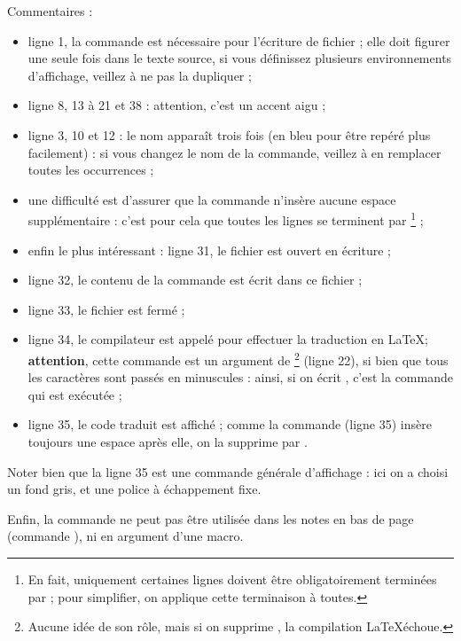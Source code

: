 Commentaires :
\begin{itemize}
  \item ligne 1, la commande  est nécessaire pour l'écriture de fichier ; elle doit figurer une seule fois dans le texte source, si vous définissez plusieurs environnements d'affichage, veillez à ne pas la dupliquer ; 
  \item ligne 8, 13 à 21 et 38 : attention, c'est un accent aigu  ;
  \item ligne 3, 10 et 12 : le nom  apparaît trois fois (en bleu pour être repéré plus facilement) : si vous changez le nom de la commande, veillez à en remplacer toutes les occurrences ;
  \item une difficulté est d'assurer que la commande n'insère aucune espace supplémentaire : c'est pour cela que toutes les lignes se terminent par \tpp{\%}\footnote{En fait, uniquement certaines lignes doivent être obligatoirement terminées par \tpp{\%} ; pour simplifier, on applique cette terminaison à toutes.} ;
    \item enfin le plus intéressant : ligne 31, le fichier  est ouvert en écriture ;
    \item ligne 32, le contenu de la commande est écrit dans ce fichier ;
    \item ligne 33, le fichier est fermé ;
    \item ligne 34, le compilateur est appelé pour effectuer la traduction en \LaTeX ; {\bf attention}, cette commande est un argument de \footnote{Aucune idée de son rôle, mais si on supprime , la compilation \LaTeX échoue.} (ligne 22), si bien que tous les caractères sont passés en minuscules : ainsi, si on écrit , c'est la commande   qui est exécutée ;
    \item ligne 35, le code traduit est affiché ; comme la commande  (ligne 35) insère toujours une espace après elle, on la supprime par .
\end{itemize}

Noter bien que la ligne 35 est une commande générale d'affichage : ici on a choisi un fond gris, et une police à échappement fixe.

Enfin, la commande  ne peut pas être utilisée dans les notes en bas de page (commande ), ni en argument d'une macro.


